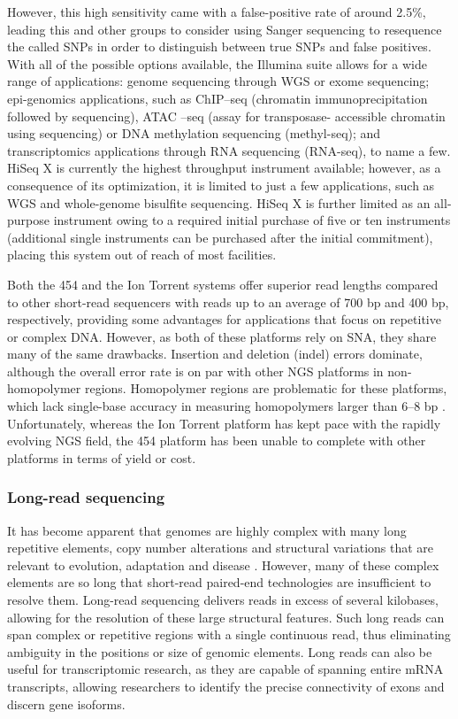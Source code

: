 However, this high sensitivity came with a false-positive rate of around 2.5\%, leading this and other groups to consider using Sanger
sequencing to resequence the called SNPs in order to distinguish between true SNPs and false positives. With all of the possible options available, the Illumina 
suite allows for a wide range of applications: genome sequencing through WGS or exome sequencing; epi-genomics applications, such as 
ChIP–seq (chromatin immunoprecipitation followed by sequencing), ATAC –seq (assay for transposase- accessible chromatin using sequencing) or DNA methylation sequencing (methyl-seq); and transcriptomics applications through 
RNA sequencing (RNA-seq), to name a few. HiSeq X is currently the highest 
throughput instrument available; however, as a consequence of its optimization, it is limited to just a few applications, such as WGS and whole-genome bisulfite 
sequencing. HiSeq X is further limited as an all-purpose instrument owing to a required initial purchase of five or ten instruments (additional single instruments can 
be purchased after the initial commitment), placing this system out of reach of most facilities.

Both the 454 and the Ion Torrent systems offer superior read lengths compared to other short-read sequencers with reads up to an average of 700 
bp and 400 bp, respectively, providing some advantages for applications that focus on repetitive or complex DNA. However, as 
both of these platforms rely on SNA, they share many of the same drawbacks. Insertion and deletion (indel) errors dominate, although the overall error rate is on par with other NGS platforms in non-homopolymer regions. 
Homopolymer regions are problematic for these platforms, which lack single-base accuracy in measuring homopolymers larger than 6–8 bp \citep{forgetta2013sequencing, loman2012performance}. Unfortunately, whereas the Ion Torrent platform has kept pace with the 
rapidly evolving NGS field, the 454 platform has been unable to complete with other platforms in terms of yield or cost. 

\subsubsection{Long-read sequencing}
 It has become apparent that genomes are highly complex with many long repetitive elements, copy number alterations and structural variations that are relevant to evolution, adaptation and disease \citep{mccarroll2007copy, stankiewicz2010structural}. 
However, many of these complex elements are so long that short-read paired-end technologies are insufficient to resolve them. Long-read sequencing delivers reads in 
excess of several kilobases, allowing for the resolution of these large structural features. Such long reads can span complex or repetitive regions with a single continuous 
read, thus eliminating ambiguity in the positions or size of genomic elements. Long reads can also be useful for 
transcriptomic research, as they are capable of spanning entire mRNA transcripts, allowing researchers to identify the precise connectivity of exons and discern gene isoforms.

